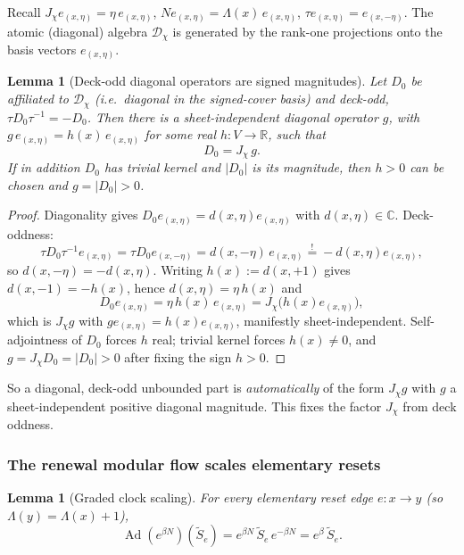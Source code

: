 \documentclass[11pt]{article}
\newtheorem{lemma}[theorem]{Lemma}
\theoremstyle{definition}
\theoremstyle{remark}
\newcommand{\R}{\mathbb{R}}
\newcommand{\C}{\mathbb{C}}
\newcommand{\Dd}{\mathcal{D}}
\newcommand{\Ad}{\operatorname{Ad}}
\newcommand{\Jchi}{J_\chi}
\newcommand{\Stilde}{\widetilde{S}}
\begin{document}
Recall $\Jchi e_{(x,\eta)}=\eta\,e_{(x,\eta)}$, $N e_{(x,\eta)}=\Lambda(x)\,
e_{(x,\eta)}$, $\tau e_{(x,\eta)}=e_{(x,-\eta)}$.  The atomic (diagonal) algebra
$\Dd_\chi$ is generated by the rank-one projections onto the basis vectors
$e_{(x,\eta)}$.

\begin{lemma}[Deck-odd diagonal operators are signed magnitudes]
\label{lem:deck-odd-normal-form}
Let $D_0$ be affiliated to $\Dd_\chi$ \textup{(}i.e.\ diagonal in the signed-cover
basis\textup{)} and deck-odd, $\tau D_0\tau^{-1}=-D_0$.  Then there is a
sheet-independent diagonal operator $g$, with $g\,e_{(x,\eta)}=h(x)\,e_{(x,\eta)}$
for some real $h:V\to\R$, such that
\[
  D_0=\Jchi\,g .
\]
If in addition $D_0$ has trivial kernel and $|D_0|$ is its magnitude, then
$h>0$ can be chosen and $g=|D_0|>0$.
\end{lemma}

\begin{proof}
Diagonality gives $D_0 e_{(x,\eta)}=d(x,\eta)e_{(x,\eta)}$ with $d(x,\eta)\in\C$.
Deck-oddness:
\[
  \tau D_0\tau^{-1}e_{(x,\eta)}
  =\tau D_0 e_{(x,-\eta)}
  =d(x,-\eta)\,e_{(x,\eta)}
  \stackrel{!}{=}-d(x,\eta)e_{(x,\eta)},
\]
so $d(x,-\eta)=-d(x,\eta)$.  Writing $h(x):=d(x,+1)$ gives $d(x,-1)=-h(x)$, hence
$d(x,\eta)=\eta\,h(x)$ and
\[
  D_0 e_{(x,\eta)}=\eta\,h(x)\,e_{(x,\eta)}=\Jchi\bigl(h(x)e_{(x,\eta)}\bigr),
\]
which is $\Jchi g$ with $g e_{(x,\eta)}=h(x)e_{(x,\eta)}$, manifestly
sheet-independent.  Self-adjointness of $D_0$ forces $h$ real; trivial kernel
forces $h(x)\neq0$, and $g=\Jchi D_0=|D_0|>0$ after fixing the sign $h>0$.
\end{proof}

So a diagonal, deck-odd unbounded part is \emph{automatically} of the form
$\Jchi g$ with $g$ a sheet-independent positive diagonal magnitude.  This fixes the factor $\Jchi$ from deck oddness.

\subsubsection{The renewal modular flow scales elementary resets}

\begin{lemma}[Graded clock scaling]
\label{lem:clock-scaling}
For every elementary reset edge $e:x\to y$ \textup{(}so $\Lambda(y)=\Lambda(x)+1$\textup{)},
\[
  \Ad(e^{\beta N})(\Stilde_e)
  =e^{\beta N}\,\Stilde_e\,e^{-\beta N}
  =e^{\beta}\,\Stilde_e .
\]
\end{lemma}
\end{document}
